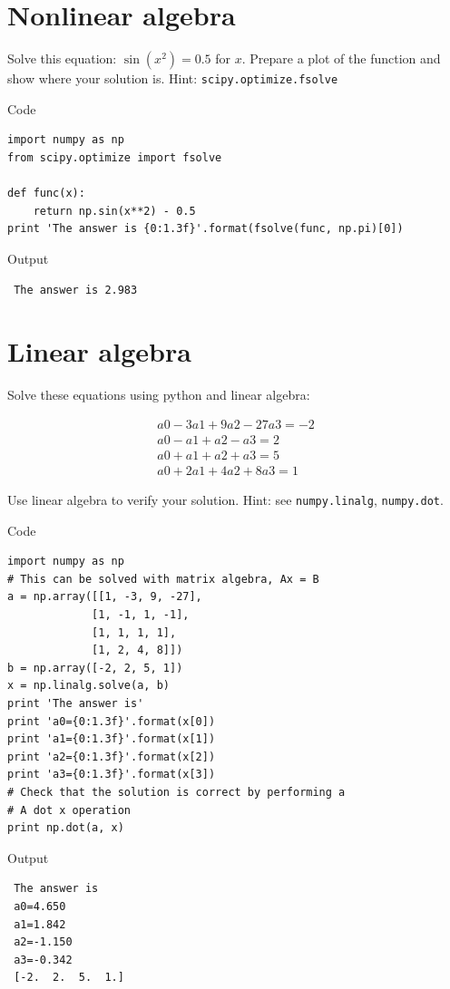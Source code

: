 \documentclass[11pt]{article}
\begin{document}
\section{Nonlinear algebra}
\label{sec-5}

Solve this equation: $\sin(x^2) = 0.5$ for $x$. Prepare a plot of the function
and show where your solution is. Hint: \texttt{scipy.optimize.fsolve}

Code

\begin{verbatim}
import numpy as np
from scipy.optimize import fsolve

def func(x):
    return np.sin(x**2) - 0.5
print 'The answer is {0:1.3f}'.format(fsolve(func, np.pi)[0])
\end{verbatim}

Output
\begin{verbatim}
 The answer is 2.983
\end{verbatim}
\section{Linear algebra}
\label{sec-6}

Solve these equations using python and linear algebra:

\begin{eqnarray}
a0 - 3 a1 + 9 a2 - 27 a3 = -2 \\
a0 - a1 + a2 - a3 = 2 \\
a0 + a1 + a2 + a3 = 5 \\
a0 + 2a1 + 4 a2 + 8 a3 = 1
\end{eqnarray}

Use linear algebra to verify your solution. Hint: see \texttt{numpy.linalg}, \texttt{numpy.dot}.

Code

\begin{verbatim}
import numpy as np
# This can be solved with matrix algebra, Ax = B
a = np.array([[1, -3, 9, -27],
             [1, -1, 1, -1],
             [1, 1, 1, 1],
             [1, 2, 4, 8]])
b = np.array([-2, 2, 5, 1])
x = np.linalg.solve(a, b)
print 'The answer is'
print 'a0={0:1.3f}'.format(x[0])
print 'a1={0:1.3f}'.format(x[1])
print 'a2={0:1.3f}'.format(x[2])
print 'a3={0:1.3f}'.format(x[3])
# Check that the solution is correct by performing a 
# A dot x operation
print np.dot(a, x)
\end{verbatim}

Output
\begin{verbatim}
 The answer is
 a0=4.650
 a1=1.842
 a2=-1.150
 a3=-0.342
 [-2.  2.  5.  1.]
\end{verbatim}
\end{document}
